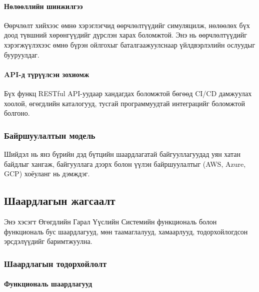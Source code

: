\paragraph{Нөлөөллийн шинжилгээ}
Өөрчлөлт хийхээс өмнө хэрэглэгчид өөрчлөлтүүдийг симуляцилж, нөлөөлөх бүх доод түвшний хөрөнгүүдийг дүрслэн харах боломжтой. Энэ нь өөрчлөлтүүдийг хэрэгжүүлэхээс өмнө бүрэн ойлгохыг баталгаажуулснаар үйлдвэрлэлийн ослуудыг бууруулдаг.

\paragraph{API-д түрүүлсэн зохиомж}
Бүх функц RESTful API-уудаар хандагдах боломжтой бөгөөд CI/CD дамжуулах хоолой, өгөгдлийн каталогууд, тусгай программуудтай интеграцийг боломжтой болгоно.

\subsubsection{Байршуулалтын модель}

Шийдэл нь янз бүрийн дэд бүтцийн шаардлагатай байгууллагуудад уян хатан байдлыг хангаж, байгууллага дээрх болон үүлэн байршуулалтыг (AWS, Azure, GCP) хоёуланг нь дэмждэг.

\subsection{Шаардлагын жагсаалт}
\label{subsec:dl_requirements}

Энэ хэсэгт Өгөгдлийн Гарал Үүслийн Системийн функциональ болон функциональ бус шаардлагууд, мөн таамаглалууд, хамаарлууд, тодорхойлогдсон эрсдэлүүдийг баримтжуулна.

\subsubsection{Шаардлагын тодорхойлолт}

\paragraph{Функциональ шаардлагууд}

